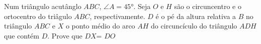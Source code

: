 Num triângulo acutânglo $ABC$, $\angle A = 45°$. Seja $O$ e $H$ são o circuncentro e o ortocentro do triâgulo $ABC$, respectivamente. $D$ é o pé da altura relativa a $B$ no triângulo $ABC$ e $X$ o ponto médio do arco $AH$ do circuncículo do triângulo $ADH$ que contém $D$. Prove que $DX$= $DO$